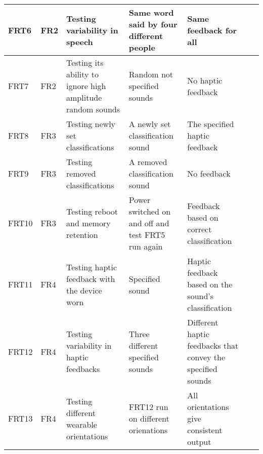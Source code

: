 \documentclass[12pt, titlepage]{article}
\begin{document}
\begin{longtable}{|p{1.4cm}|p{1cm}|p{3cm}|p{1.5cm}|p{2.5cm}|p{2cm}|p{1.2cm}|}
  FRT6        & FR2          & Testing variability in speech                                                & Same word said by four different people           & Same feedback for all                                       &                        &                                                    \\ \hline
  FRT7        & FR2          & Testing its ability to ignore high amplitude random sounds                   & Random not specified sounds                       & No haptic feedback                                          &                        &                                                    \\ \hline
  FRT8        & FR3          & Testing newly set classifications                                            & A newly set classification sound                  & The specified haptic feedback                               &                        &                                                    \\ \hline
  FRT9        & FR3          & Testing removed classifications                                              & A removed classification sound                    & No feedback                                                 &                        &                                                    \\ \hline
  FRT10       & FR3          & Testing reboot and memory retention                                          & Power switched on and off and test FRT5 run again & Feedback based on correct classification                    &                        &                                                    \\ \hline
  FRT11       & FR4          & Testing haptic feedback with the device worn                                 & Specified sound                                   & Haptic feedback based on the sound's classification         &                        &                                                    \\ \hline
  FRT12       & FR4          & Testing variability in haptic feedbacks                                      & Three different specified sounds                  & Different haptic feedbacks that convey the specified sounds &                        &                                                    \\ \hline
  FRT13       & FR4          & Testing different wearable orientations                                      & FRT12 run on different orienations                & All orientations give consistent output                     &                        &                                                    \\ \hline

\end{longtable}
\end{document}
